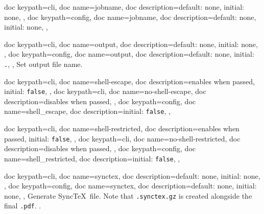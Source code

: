 \documentclass[a4paper, 11pt]{scrartcl}
\begin{document}
\begin{docKeys}[
		doc parameter={=\meta{jobname}},
	]{
		{
			doc keypath=cli,
			doc name=jobname,
			doc description={default: none, initial: none},
		},
		{
			doc keypath=config,
			doc name=jobname,
			doc description={default: none, initial: none},
		},
	}
\end{docKeys}
\begin{docKeys}[
		doc parameter={=\meta{output}},
	]{
		{
			doc keypath=cli,
			doc name=output,
			doc description={default: none, initial: none},
		},
		{
			doc keypath=config,
			doc name=output,
			doc description={default: none, initial: \texttt{.}},
		},
	}
	Set output file name.
\end{docKeys}
\begin{docKeys}[
	]{
		{
			doc keypath=cli,
			doc name=shell-escape,
			doc description={enables when passed, initial: \texttt{false}},
		},
		{
			doc keypath=cli,
			doc name=no-shell-escape,
			doc description={disables when passed},
		},
		{
			doc keypath=config,
			doc name=shell_escape,
			doc description={initial: \texttt{false}},
		},
	}
	\Todo{}
\end{docKeys}
\begin{docKeys}[
	]{
		{
			doc keypath=cli,
			doc name=shell-restricted,
			doc description={enables when passed, initial: \texttt{false}},
		},
		{
			doc keypath=cli,
			doc name=no-shell-restricted,
			doc description={disables when passed},
		},
		{
			doc keypath=config,
			doc name=shell_restricted,
			doc description={initial: \texttt{false}},
		},
	}
	\Todo{}
\end{docKeys}
\begin{docKeys}[
		doc parameter={=\meta{synctex}},
	]{
		{
			doc keypath=cli,
			doc name=synctex,
			doc description={default: none, initial: none},
		},
		{
			doc keypath=config,
			doc name=synctex,
			doc description={default: none, initial: none},
		},
	}
	Generate Sync\TeX\ file.
	Note that \texttt{.synctex.gz} is created alongside the final \texttt{.pdf}.
	.
\end{docKeys}
\end{document}
